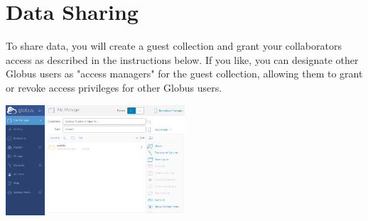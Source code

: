 \chapter{Data Sharing}

To share data, you will create a guest collection and grant your collaborators 
access as described in the instructions below. If you like, you can designate 
other Globus users as "access managers" for the guest collection, allowing them 
to grant or revoke access privileges for other Globus users.

\begin{center}
\includegraphics[width=0.5\textwidth]{img/sharedata-1.png}
\end{center}

